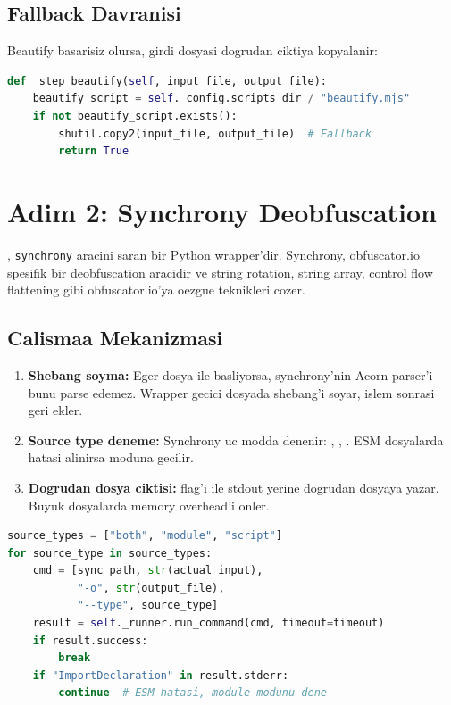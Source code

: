 \subsection{Fallback Davranisi}

Beautify basarisiz olursa, girdi dosyasi dogrudan ciktiya kopyalanir:

\begin{lstlisting}[language=Python, caption={Beautify fallback -- manager.py}]
def _step_beautify(self, input_file, output_file):
    beautify_script = self._config.scripts_dir / "beautify.mjs"
    if not beautify_script.exists():
        shutil.copy2(input_file, output_file)  # Fallback
        return True
\end{lstlisting}


\section{Adim 2: Synchrony Deobfuscation}
\label{sec:synchrony}

, \texttt{synchrony} aracini saran bir Python wrapper'dir. Synchrony, obfuscator.io spesifik bir deobfuscation aracidir ve string rotation, string array, control flow flattening gibi obfuscator.io'ya oezgue teknikleri cozer.

\subsection{Calismaa Mekanizmasi}

\begin{enumerate}
\item \textbf{Shebang soyma:} Eger dosya  ile basliyorsa, synchrony'nin Acorn parser'i bunu parse edemez. Wrapper gecici dosyada shebang'i soyar, islem sonrasi geri ekler.
\item \textbf{Source type deneme:} Synchrony uc modda denenir: , , . ESM dosyalarda  hatasi alinirsa  moduna gecilir.
\item \textbf{Dogrudan dosya ciktisi:}  flag'i ile stdout yerine dogrudan dosyaya yazar. Buyuk dosyalarda memory overhead'i onler.
\end{enumerate}

\begin{lstlisting}[language=Python, caption={Synchrony calisma akisi -- synchrony\_wrapper.py}]
source_types = ["both", "module", "script"]
for source_type in source_types:
    cmd = [sync_path, str(actual_input),
           "-o", str(output_file),
           "--type", source_type]
    result = self._runner.run_command(cmd, timeout=timeout)
    if result.success:
        break
    if "ImportDeclaration" in result.stderr:
        continue  # ESM hatasi, module modunu dene
\end{lstlisting}

